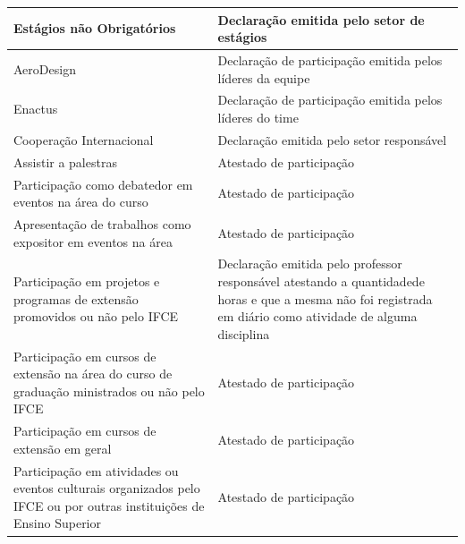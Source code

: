 \begin{longtable}{|p{8.5cm}|p{5.5cm}|}
	\hline
	
	Estágios não Obrigatórios & Declaração emitida pelo setor de estágios \\
	
	\hline
	
	AeroDesign & Declaração de participação emitida pelos líderes da equipe \\ 
	
	\hline
	
	Enactus & Declaração de participação emitida pelos líderes do time \\
	
	\hline
	
	Cooperação Internacional & Declaração emitida pelo setor responsável \\
	
	\hline
	
	Assistir a palestras & Atestado de participação \\
	
	\hline
	
	Participação como debatedor em eventos na área do curso & Atestado de participação \\
	
	\hline
	
	Apresentação de trabalhos como expositor em eventos na área & Atestado de participação \\
	
	\hline
	
	Participação em projetos e programas de extensão promovidos ou não pelo IFCE & Declaração emitida pelo professor responsável atestando a quantidadede horas e que a mesma não foi registrada em diário como atividade de alguma disciplina \\
	
	\hline
	
	Participação em cursos de extensão na área do curso de graduação ministrados ou não pelo IFCE & Atestado de participação \\
	
	\hline
	
	Participação em cursos de extensão em geral & Atestado de participação \\
	
	\hline
	
	Participação em atividades ou eventos culturais organizados pelo IFCE ou por outras instituições de Ensino Superior & Atestado de participação \\
	
	\hline
	

\end{longtable}
